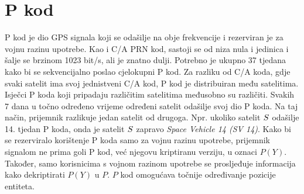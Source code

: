 \documentclass[a4paper,twoside,12pt]{memoir} %
\begin{document}
	
	\section{P kod}\label{Pkod}
	P kod je dio GPS signala koji se odašilje na obje frekvencije i rezerviran je za vojnu razinu upotrebe.
	Kao i C/A PRN kod, sastoji se od niza nula i jedinica i šalje se brzinom 1023 bit/s, ali je znatno dulji.
	Potrebno je ukupno 37 tjedana kako bi se sekvencijalno poslao cjelokupni P kod.
	Za razliku od C/A koda, gdje svaki satelit ima svoj jednistveni C/A kod, P kod je
	distribuiran među satelitima. Isječci P koda koji pripadaju različitim satelitima međusobno su različiti.
	Svakih 7 dana u točno određeno vrijeme određeni satelit odašilje svoj dio P koda.
	Na taj način, prijemnik razlikuje jedan satelit od drugoga. Npr. ukoliko
	satelit $\mathnormal{S}$ odašilje 14. tjedan P koda, onda je satelit $\mathnormal{S}$
	zapravo \textit{Space Vehicle 14 (SV 14)}.
	Kako bi se rezerviralo korištenje P koda samo za vojnu razinu upotrebe,
	prijemnik signalom ne prima goli P kod, već njegovu kriptiranu verziju, u oznaci $P(Y)$.
	Također, samo korisnicima s vojnom razinom upotrebe se prosljeđuje informacija kako dekriptirati $P(Y)$ u $P$.
	$P$ kod omogućava točnije određivanje pozicije entiteta.
	
\end{document}
